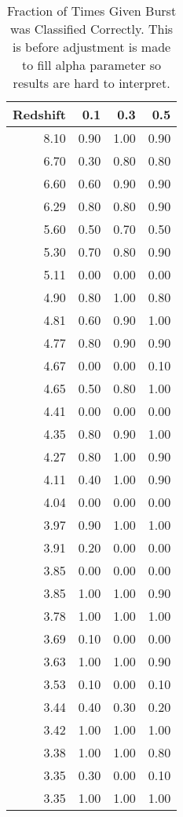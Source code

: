 \begin{table}[H]
\begin{center}
\begin{tabular}{rrrr}
  \hline
Redshift & 0.1 & 0.3 & 0.5 \\ 
  \hline
8.10 & 0.90 & 1.00 & 0.90 \\ 
  6.70 & 0.30 & 0.80 & 0.80 \\ 
  6.60 & 0.60 & 0.90 & 0.90 \\ 
  6.29 & 0.80 & 0.80 & 0.90 \\ 
  5.60 & 0.50 & 0.70 & 0.50 \\ 
  5.30 & 0.70 & 0.80 & 0.90 \\ 
  5.11 & 0.00 & 0.00 & 0.00 \\ 
  4.90 & 0.80 & 1.00 & 0.80 \\ 
  4.81 & 0.60 & 0.90 & 1.00 \\ 
  4.77 & 0.80 & 0.90 & 0.90 \\ 
  4.67 & 0.00 & 0.00 & 0.10 \\ 
  4.65 & 0.50 & 0.80 & 1.00 \\ 
  4.41 & 0.00 & 0.00 & 0.00 \\ 
  4.35 & 0.80 & 0.90 & 1.00 \\ 
  4.27 & 0.80 & 1.00 & 0.90 \\ 
  4.11 & 0.40 & 1.00 & 0.90 \\ 
  4.04 & 0.00 & 0.00 & 0.00 \\ 
  3.97 & 0.90 & 1.00 & 1.00 \\ 
  3.91 & 0.20 & 0.00 & 0.00 \\ 
  3.85 & 0.00 & 0.00 & 0.00 \\ 
  3.85 & 1.00 & 1.00 & 0.90 \\ 
  3.78 & 1.00 & 1.00 & 1.00 \\ 
  3.69 & 0.10 & 0.00 & 0.00 \\ 
  3.63 & 1.00 & 1.00 & 0.90 \\ 
  3.53 & 0.10 & 0.00 & 0.10 \\ 
  3.44 & 0.40 & 0.30 & 0.20 \\ 
  3.42 & 1.00 & 1.00 & 1.00 \\ 
  3.38 & 1.00 & 1.00 & 0.80 \\ 
  3.35 & 0.30 & 0.00 & 0.10 \\ 
  3.35 & 1.00 & 1.00 & 1.00 \\ 
   \hline
\end{tabular}
\caption{Fraction of Times Given Burst was Classified Correctly. This is before adjustment is made to fill alpha parameter so results are hard to interpret.}
\end{center}
\end{table}
